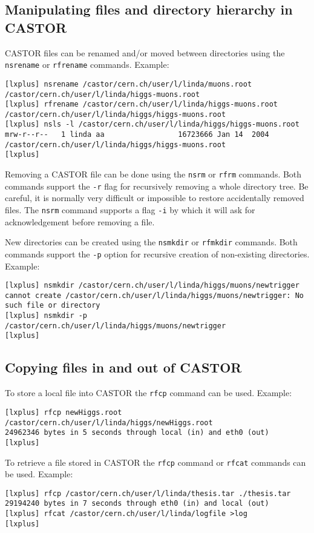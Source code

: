 \subsection{Manipulating files and directory hierarchy in CASTOR}
CASTOR files can be renamed and/or moved between directories using the {\tt nsrename} or
{\tt rfrename} commands. Example:
\small
\begin{verbatim}
[lxplus] nsrename /castor/cern.ch/user/l/linda/muons.root /castor/cern.ch/user/l/linda/higgs-muons.root
[lxplus] rfrename /castor/cern.ch/user/l/linda/higgs-muons.root /castor/cern.ch/user/l/linda/higgs/higgs-muons.root
[lxplus] nsls -l /castor/cern.ch/user/l/linda/higgs/higgs-muons.root
mrw-r--r--   1 linda aa                 16723666 Jan 14  2004  /castor/cern.ch/user/l/linda/higgs/higgs-muons.root
[lxplus]
\end{verbatim}
\normalsize

Removing a CASTOR file can be done using the {\tt nsrm} or {\tt rfrm} commands. Both commands
support the {\tt -r} flag for recursively removing a whole directory tree. Be careful, it is
normally very difficult or impossible to restore accidentally removed files. The {\tt nsrm}
command supports a flag {\tt -i} by which it will ask for acknowledgement before removing a file.

New directories can be created using the {\tt nsmkdir} or {\tt rfmkdir} commands. Both
commands support the {\tt -p} option for recursive creation of non-existing directories. Example:
\small
\begin{verbatim}
[lxplus] nsmkdir /castor/cern.ch/user/l/linda/higgs/muons/newtrigger
cannot create /castor/cern.ch/user/l/linda/higgs/muons/newtrigger: No such file or directory
[lxplus] nsmkdir -p /castor/cern.ch/user/l/linda/higgs/muons/newtrigger
[lxplus]
\end{verbatim}
\normalsize

\subsection{Copying files in and out of CASTOR}
To store a local file into CASTOR the {\tt rfcp} command can be used. Example:
\small
\begin{verbatim}
[lxplus] rfcp newHiggs.root /castor/cern.ch/user/l/linda/higgs/newHiggs.root
24962346 bytes in 5 seconds through local (in) and eth0 (out)
[lxplus]
\end{verbatim}
\normalsize

To retrieve a file stored in CASTOR the {\tt rfcp} command or {\tt rfcat} commands
can be used. Example:
\small
\begin{verbatim}
[lxplus] rfcp /castor/cern.ch/user/l/linda/thesis.tar ./thesis.tar
29194240 bytes in 7 seconds through eth0 (in) and local (out)
[lxplus] rfcat /castor/cern.ch/user/l/linda/logfile >log
[lxplus]
\end{verbatim}
\normalsize

